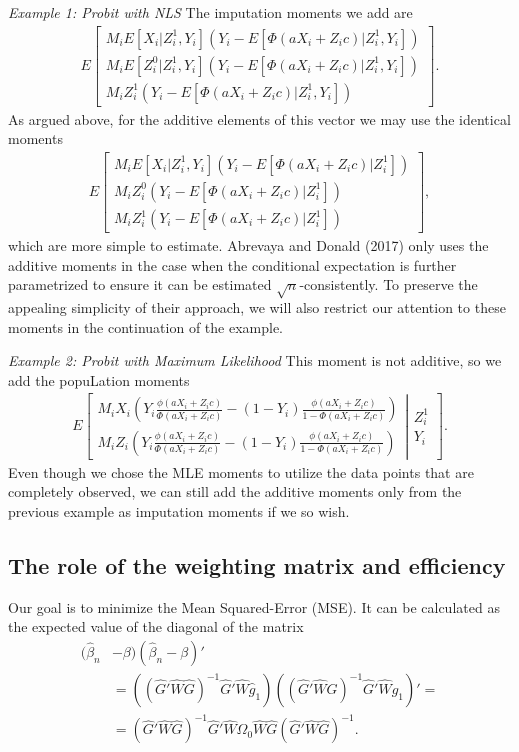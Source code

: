 \documentclass{article}
\theoremstyle{definition}
\theoremstyle{remark}
\begin{document}
\emph{Example 1: Probit with NLS}
The imputation moments we add are
\begin{align}
E\left[\begin{array}{c}
M_i E[X_i|Z^1_i, Y_i](Y_i-E[\Phi(aX_i+Z_ic)|Z_i^1,Y_i])\\
M_i E[Z_i^0|Z^1_i, Y_i](Y_i-E[\Phi(aX_i+Z_ic)|Z_i^1,Y_i]) \\
M_i Z^1_i(Y_i-E[\Phi(aX_i+Z_ic)|Z_i^1,Y_i])
\end{array}
\right].
\end{align}
As argued above, for the additive elements of this vector we may use the identical moments
\begin{align}
E\left[\begin{array}{c}
M_i E[X_i|Z^1_i, Y_i](Y_i-E[\Phi(aX_i+Z_ic)|Z_i^1])\\
M_i Z_i^0(Y_i-E[\Phi(aX_i+Z_ic)|Z_i^1]) \\
M_i Z^1_i(Y_i-E[\Phi(aX_i+Z_ic)|Z_i^1])
\end{array}
\right],
\end{align}
which are more simple to estimate. Abrevaya and Donald (2017) only uses the additive moments in the case when the conditional expectation is further parametrized to ensure it can be estimated $\sqrt{n}$-consistently. To preserve the appealing simplicity of their approach, we will also restrict our attention to these moments in the continuation of the example.

\emph{Example 2: Probit with Maximum Likelihood}
This moment is not additive, so we add the popuLation moments
\begin{align*}
E\left[\left.\begin{array}{c}
M_i X_i\left(Y_i \frac{\phi(aX_i+Z_ic)}{\Phi(aX_i+Z_ic)} - (1-Y_i)\frac{\phi(aX_i+Z_ic)}{1-\Phi(aX_i+Z_ic)}\right) \\
M_i Z_i\left(Y_i \frac{\phi(aX_i+Z_ic)}{\Phi(aX_i+Z_ic)} - (1-Y_i)\frac{\phi(aX_i+Z_ic)}{1-\Phi(aX_i+Z_ic)}\right)
\end{array}
\right| \begin{array}{c} Z_i^1 \\ Y_i \end{array}\right].
\end{align*}
Even though we chose the MLE moments to utilize the data points that are completely observed, we can still add the additive moments only from the previous example as imputation moments if we so wish.

\subsection{The role of the weighting matrix and efficiency}
Our goal is to minimize the Mean Squared-Error (MSE). It can be calculated as the expected value of the diagonal of the matrix
\begin{align}
(\hat{\beta}_n &-\beta)(\hat{\beta}_n -\beta)' \\
&=((\hat{G}'\hat{W}\hat{G})^{-1}\hat{G}'\hat{W}\hat{g}_1)((\hat{G}'\hat{W}\hat{G})^{-1}\hat{G}'\hat{W}\hat{g}_1)'= \nonumber \\
&= (\hat{G}'\hat{W}\hat{G})^{-1} \hat{G}'\hat{W} \hat{\Omega}_0 \hat{W} \hat{G} (\hat{G}'\hat{W}\hat{G})^{-1}. \nonumber
\end{align}
\end{document}
